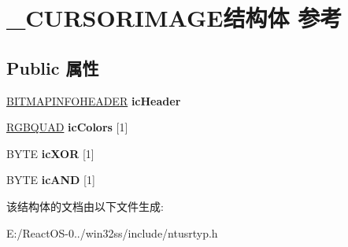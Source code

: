 \hypertarget{struct___c_u_r_s_o_r_i_m_a_g_e}{}\section{\+\_\+\+C\+U\+R\+S\+O\+R\+I\+M\+A\+G\+E结构体 参考}
\label{struct___c_u_r_s_o_r_i_m_a_g_e}
\subsection*{Public 属性}
\begin{DoxyCompactItemize}
\item 
\mbox{\label{struct___c_u_r_s_o_r_i_m_a_g_e_add18cfed37a1e655c8724d3698b8b463}} 
\hyperlink{struct_b_i_t_m_a_p_i_n_f_o_h_e_a_d_e_r}{B\+I\+T\+M\+A\+P\+I\+N\+F\+O\+H\+E\+A\+D\+ER} {\bfseries ic\+Header}
\item 
\mbox{\label{struct___c_u_r_s_o_r_i_m_a_g_e_a5b6595c4ee90276639feaafb3223996f}} 
\hyperlink{structtag_r_g_b_q_u_a_d}{R\+G\+B\+Q\+U\+AD} {\bfseries ic\+Colors} \mbox{[}1\mbox{]}
\item 
\mbox{\label{struct___c_u_r_s_o_r_i_m_a_g_e_adb5b1a2ed33797ca0844770ceab2ccec}} 
B\+Y\+TE {\bfseries ic\+X\+OR} \mbox{[}1\mbox{]}
\item 
\mbox{\label{struct___c_u_r_s_o_r_i_m_a_g_e_ae1574f32ec35b4c7fcd15d1ac30f9abc}} 
B\+Y\+TE {\bfseries ic\+A\+ND} \mbox{[}1\mbox{]}
\end{DoxyCompactItemize}


该结构体的文档由以下文件生成\+:\begin{DoxyCompactItemize}
\item 
E\+:/\+React\+O\+S-\/0../win32ss/include/ntusrtyp.\+h\end{DoxyCompactItemize}
